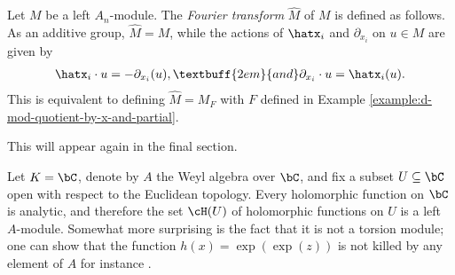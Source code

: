 \begin{defn}\label{defn:fourier-transform}
	Let $M$ be a left $A_n$-module. The \emph{Fourier transform} $\widehat{M}$ of $M$ is defined as follows. As an additive group, $\widehat{M} = M$, while the actions of $\hatx_i$ and $\partial_{x_i}$ on $u \in M$ are given by
	\begin{align*}
		\hatx_i\cdot u = -\partial_{x_i}(u), \textbuff{2em}{and} \partial_{x_i}\cdot u = \hatx_i(u).
	\end{align*}
	This is equivalent to defining $\widehat{M} = M_F$ with $F$ defined in Example \ref{example:d-mod-quotient-by-x-and-partial}.
\end{defn}
This will appear again in the final section.
\begin{example}\label{example:d-mod-holomorphic-functions}
	Let $K = \bC$, denote by $A$ the Weyl algebra over $\bC$, and fix a subset $U \subseteq \bC$ open with respect to the Euclidean topology. Every holomorphic function on $\bC$ is analytic, and therefore the set $\cH(U)$ of holomorphic functions on $U$ is a left $A$-module. Somewhat more surprising is the fact that it is not a torsion module; one can show that the function $h(x) = \exp(\exp(z))$ is not killed by any element of $A$ for instance \cite[Proposition 5.3.2]{d-mod-primer}.
\end{example}
